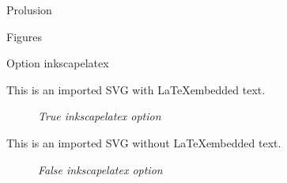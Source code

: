 \begin{chapter}{Prolusion}
\begin{section}{Figures}
\begin{subsection}{Option inkscapelatex}
		\par This is an imported SVG with \LaTeX embedded text.
		\begin{figure}[ht]
			\centering
			
			\caption{\emph{True inkscapelatex option}}
			\label{fig:latexembedded}
		\end{figure}
		\par This is an imported SVG without \LaTeX embedded text.
		\begin{figure}[ht]
			\centering
			
			\caption{\emph{False inkscapelatex option}}
			\label{fig:latexnotembedded}
		\end{figure}
	\end{subsection}
    \end{section}
\end{chapter}